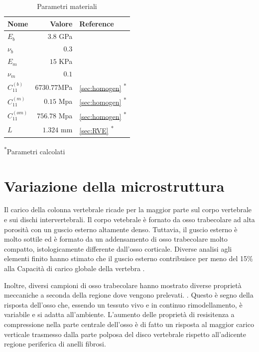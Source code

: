 \documentclass[a4paper,num-refs]{oup-contemporary}
\begin{document}
\begin{table}[bt!]
	\caption{Parametri materiali}\label{tab:example}
	\begin{tabular}{l r l}
		\toprule
		Nome & Valore &  Reference\\
		\midrule
		$E_b$ & $3.8$ GPa & \citet{Cowin1}  \\
		$\nu_b$  & $0.3$ & \citet{Dalstra:93,Wirtz:2000}  \\
		$E_m$  & $15$ KPa  & \citet{Jansen:2015} \\ 
		$\nu_m$ & $0.1 $&    \\
		
		$C_{11}^{(b)}$&$6730.77 $MPa& \cref{sec:homogen} \textsuperscript{*}\\
		$C_{11}^{(m)}$& $0.15$ Mpa& \cref{sec:homogen} \textsuperscript{*}\\
		$C_{11}^{(om)}$& $756.78 $ Mpa & \cref{sec:homogen} \textsuperscript{*}\\
		$L$ & $1.324$ mm& \cref{sec:RVE} \textsuperscript{*}\\
		\bottomrule
	\end{tabular}
	\begin{tablenotes}
		
		\item \textsuperscript{*}Parametri calcolati
	\end{tablenotes}
\end{table}


\section{Variazione della microstruttura}

Il carico della colonna vertebrale ricade per la maggior parte sul corpo vertebrale e sui dischi intervertebrali. Il corpo vetebrale è fornato da osso trabecolare ad alta porosità con un guscio esterno altamente denso. Tuttavia, il guscio esterno è molto sottile ed è formato da un addensamento di osso trabecolare molto compatto, istologicamente differente dall'osso corticale. Diverse analisi agli elementi finito hanno stimato che il guscio esterno contribuisce per meno del 15\% alla Capacità di carico globale della vertebra \citep{Ferguson:2003, Silva:1997}.

Inoltre, diversi campioni di osso trabecolare hanno mostrato diverse proprietà meccaniche a seconda della regione dove vengono prelevati. \citep{Keller:1989,Keller:1993}. Questo è segno della risposta dell'osso che, essendo un tessuto vivo e in continuo rimodellamento, è variabile e si adatta all'ambiente. L'aumento delle proprietà di resisitenza a compressione nella parte centrale dell'osso è di fatto un risposta al maggior carico verticale trasmesso dalla parte polposa del disco vertebrale rispetto all'adicente regione periferica di anelli fibrosi. 
\end{document}
